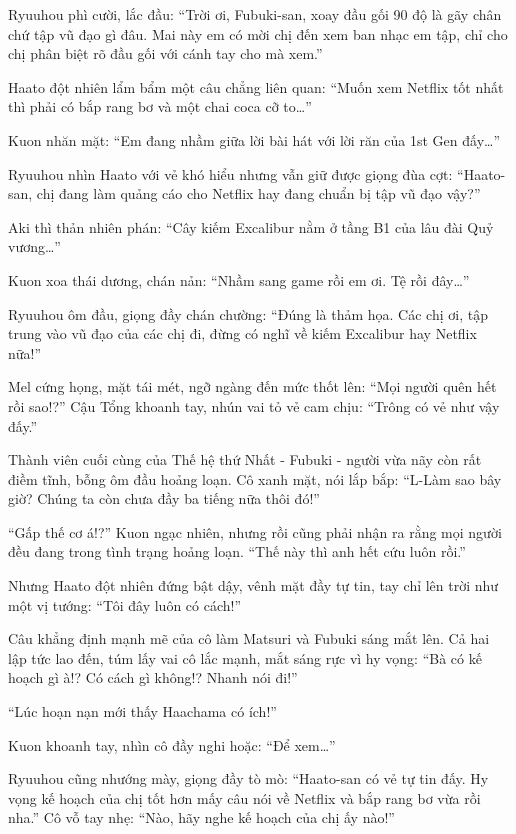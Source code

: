\documentclass[../main.tex]{subfiles}
\begin{document}
Ryuuhou phì cười, lắc đầu: ``Trời ơi, Fubuki-san, xoay đầu gối 90 độ là gãy chân chứ tập vũ đạo gì đâu. Mai này em có mời chị đến xem ban nhạc em tập, chỉ cho chị phân biệt rõ đầu gối với cánh tay cho mà xem.''

Haato đột nhiên lẩm bẩm một câu chẳng liên quan: ``Muốn xem Netflix tốt nhất thì phải có bắp rang bơ và một chai coca cỡ to\dots''

Kuon nhăn mặt: ``Em đang nhầm giữa lời bài hát với lời răn của 1st Gen đấy\dots''

Ryuuhou nhìn Haato với vẻ khó hiểu nhưng vẫn giữ được giọng đùa cợt: ``Haato-san, chị đang làm quảng cáo cho Netflix hay đang chuẩn bị tập vũ đạo vậy?''

Aki thì thản nhiên phán: ``Cây kiếm Excalibur nằm ở tầng B1 của lâu đài Quỷ vương\dots''

Kuon xoa thái dương, chán nản: ``Nhầm sang game rồi em ơi. Tệ rồi đây\dots''

Ryuuhou ôm đầu, giọng đầy chán chường: ``Đúng là thảm họa. Các chị ơi, tập trung vào vũ đạo của các chị đi, đừng có nghĩ về kiếm Excalibur hay Netflix nữa!''

Mel cứng họng, mặt tái mét, ngỡ ngàng đến mức thốt lên: ``Mọi người quên hết rồi sao!?'' Cậu Tổng khoanh tay, nhún vai tỏ vẻ cam chịu: ``Trông có vẻ như vậy đấy.''

Thành viên cuối cùng của Thế hệ thứ Nhất - Fubuki - người vừa nãy còn rất điềm tĩnh, bỗng ôm đầu hoảng loạn. Cô xanh mặt, nói lắp bắp: ``L-Làm sao bây giờ? Chúng ta còn chưa đầy ba tiếng nữa thôi đó!''

``Gấp thế cơ á!?'' Kuon ngạc nhiên, nhưng rồi cũng phải nhận ra rằng mọi người đều đang trong tình trạng hoảng loạn. ``Thế này thì anh hết cứu luôn rồi.''

Nhưng Haato đột nhiên đứng bật dậy, vênh mặt đầy tự tin, tay chỉ lên trời như một vị tướng: ``Tôi đây luôn có cách!''

Câu khẳng định mạnh mẽ của cô làm Matsuri và Fubuki sáng mắt lên. Cả hai lập tức lao đến, túm lấy vai cô lắc mạnh, mắt sáng rực vì hy vọng: ``Bà có kế hoạch gì à!? Có cách gì không!? Nhanh nói đi!''

``Lúc hoạn nạn mới thấy Haachama có ích!''

Kuon khoanh tay, nhìn cô đầy nghi hoặc: ``Để xem\dots''

Ryuuhou cũng nhướng mày, giọng đầy tò mò: ``Haato-san có vẻ tự tin đấy. Hy vọng kế hoạch của chị tốt hơn mấy câu nói về Netflix và bắp rang bơ vừa rồi nha.'' Cô vỗ tay nhẹ: ``Nào, hãy nghe kế hoạch của chị ấy nào!''
\end{document}
